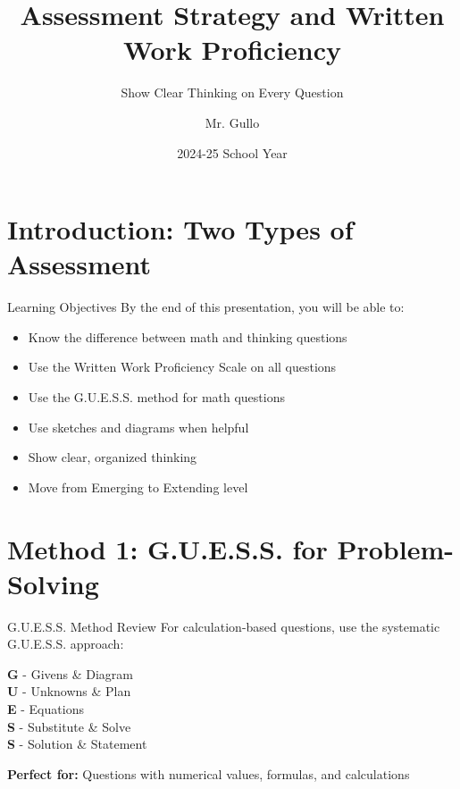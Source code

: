 \documentclass{beamer}
\title[Assessment Tips and Proficiency]{Assessment Strategy and Written Work Proficiency}
\subtitle{Show Clear Thinking on Every Question}
\author[Mr. Gullo]{Mr. Gullo}
\date[2024-25]{2024-25 School Year}
\begin{document}
\frame{\titlepage}

\section{Introduction: Two Types of Assessment}

\begin{frame}{Learning Objectives}
By the end of this presentation, you will be able to:
\begin{itemize}
\item Know the difference between math and thinking questions \pause
\item Use the Written Work Proficiency Scale on all questions \pause
\item Use the G.U.E.S.S. method for math questions \pause
\item Use sketches and diagrams when helpful \pause
\item Show clear, organized thinking \pause
\item Move from Emerging to Extending level
\end{itemize}
\end{frame}


\section{Method 1: G.U.E.S.S. for Problem-Solving}

\begin{frame}{G.U.E.S.S. Method Review}
For calculation-based questions, use the systematic G.U.E.S.S. approach:

\pause
\vspace{0.5cm}
\begin{flushleft}
\textbf{G} - Givens \& Diagram \pause \\
\textbf{U} - Unknowns \& Plan \pause \\
\textbf{E} - Equations \pause \\
\textbf{S} - Substitute \& Solve \pause \\
\textbf{S} - Solution \& Statement \\
\end{flushleft}

\pause
\vspace{0.5cm}
\textbf{Perfect for:} Questions with numerical values, formulas, and calculations
\end{frame}
\end{document}
